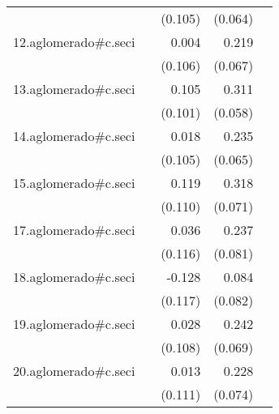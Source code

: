 {\begin{longtable}{l*{4}{D{.}{.}{-1}}}
            &                     &     (0.105)         &     (0.064)         &                     \\
\addlinespace
12.aglomerado#c.seci&                     &       0.004         &       0.219\sym{**} &                     \\
            &                     &     (0.106)         &     (0.067)         &                     \\
\addlinespace
13.aglomerado#c.seci&                     &       0.105         &       0.311\sym{***}&                     \\
            &                     &     (0.101)         &     (0.058)         &                     \\
\addlinespace
14.aglomerado#c.seci&                     &       0.018         &       0.235\sym{***}&                     \\
            &                     &     (0.105)         &     (0.065)         &                     \\
\addlinespace
15.aglomerado#c.seci&                     &       0.119         &       0.318\sym{***}&                     \\
            &                     &     (0.110)         &     (0.071)         &                     \\
\addlinespace
17.aglomerado#c.seci&                     &       0.036         &       0.237\sym{**} &                     \\
            &                     &     (0.116)         &     (0.081)         &                     \\
\addlinespace
18.aglomerado#c.seci&                     &      -0.128         &       0.084         &                     \\
            &                     &     (0.117)         &     (0.082)         &                     \\
\addlinespace
19.aglomerado#c.seci&                     &       0.028         &       0.242\sym{***}&                     \\
            &                     &     (0.108)         &     (0.069)         &                     \\
\addlinespace
20.aglomerado#c.seci&                     &       0.013         &       0.228\sym{**} &                     \\
            &                     &     (0.111)         &     (0.074)         &                     \\

\end{longtable}}
